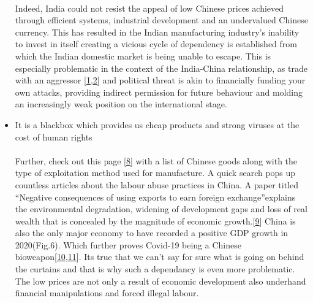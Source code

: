 \documentclass{article}
\begin{document}
\begin{itemize}[nosep , left=0pt , topsep=0pt]
            \paragraph{}
            Indeed, India could not resist the appeal of low Chinese prices achieved through efficient systems, industrial development and an undervalued Chinese currency.
            This has resulted in the Indian manufacturing industry’s inability to invest in itself creating a vicious cycle of dependency is established from which the Indian domestic market is being unable to escape.
            This is especially problematic in the context of the India-China relationship, as trade with an aggressor [\hyperlink{link1}{1},\hyperlink{link2}{2}] and political threat is akin to financially funding your own attacks, providing indirect permission for future behaviour and molding an increasingly weak position on the international stage. 
\bigskip
        \item It is a blackbox which provides us cheap products and strong viruses at the cost of human rights
            \paragraph{}
            Further, check out this page [\hyperlink{link8}{8}] with a list of Chinese goods along with the type of exploitation method used for manufacture. A quick search pops up countless articles about the labour abuse practices in China. A paper titled “Negative consequences of using exports to earn foreign exchange”explains the environmental degradation, widening of development gaps and loss of real wealth that is concealed by the magnitude of economic growth.[\hyperlink{link9}{9}]
            China is also the only major economy to have recorded a positive GDP growth in 2020(Fig.6). Which further proves Covid-19 being a Chinese bioweapon[\hyperlink{link10}{10},\hyperlink{link11}{11}]. Its true that we can’t say for sure what is going on behind the curtains and that is why such a dependancy is even more problematic.
            The low prices are not only a result of economic development also underhand financial manipulations and forced illegal labour.


\end{itemize}
\end{document}
